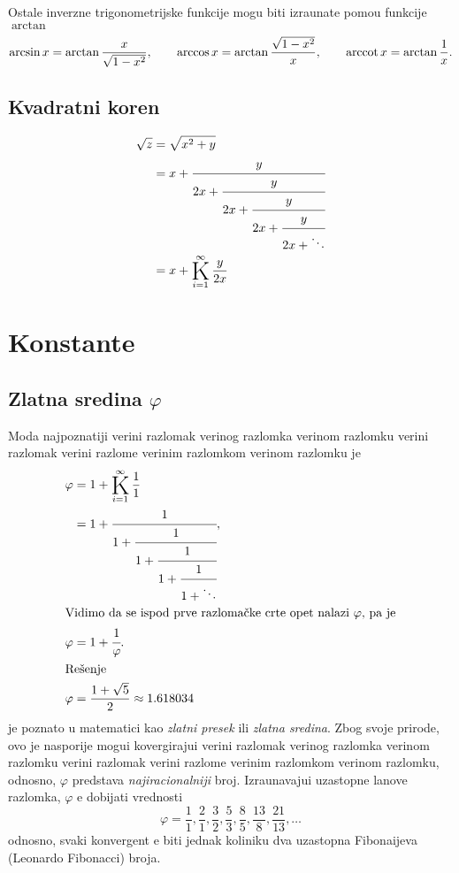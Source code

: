 \documentclass[12pt, twoside, a4paper]{article}
\def\vr#1{\ifcase#1\relax\or
  ve\-ri{\zv}\-ni raz\-lo\-mak\or
  ve\-ri{\zv}\-nog raz\-lom\-ka\or
  ve\-ri{\zv}\-nom raz\-lom\-ku\or
  ve\-ri{\zv}\-ni raz\-lo\-mak\or
  ve\-ri{\zv}\-ni raz\-lom\-{\cv}e\or
  ve\-ri{\zv}\-nim raz\-lom\-kom\or
  ve\-ri{\zv}\-nom raz\-lom\-ku\fi}
\begin{document}
\def\arccot{\mathop{\rm arccot}}
Ostale inverzne trigonometrijske funkcije mogu biti izra{\cv}unate pomo{\cc}u funkcije $\arctan$
$$
\arcsin x = \arctan{x\over \sqrt{1-x^2}},\qquad
\arccos x = \arctan{\sqrt{1-x^2}\over x},\qquad
\arccot x = \arctan{1\over x}.
$$

\iffalse

\subsection{Stepenova{\nj}e}

\def\rn#1{#1(2x^n+y)}
\def\rd#1{(m^2-#1^2n^2)y^2}
\begin{align*}
z^{m/n}&=(x^n+y)^{m/n}\\
&=x^m+
\cfrac{2x^m\cdot my}{\rn n-my+
\cfrac{\rd1}{\rn3+\cfrac{\rd2}{\rn5+\cfrac{\rd3}{\rn7+\ddots}}}}\\
&=x^m+{2x^m\cdot my \over \rn n-my+}\K_{i=1}^\infty{\rd i \over (2i+1)(2x^n+y)}
\end{align*}

\fi

\subsection{Kvadratni koren}

\begin{align*}
\sqrt z&=\sqrt{x^2+y}\\
&=x+
\cfrac{y}{2x+\cfrac{y}{2x+\cfrac{y}{2x+\cfrac{y}{2x+\ddots}}}}\\
&=x+\Kinf y{2x}
\end{align*}



\section{Konstante}

\subsection{Zlatna sredina $\varphi$}

Mo{\zv}da najpoznatiji \vr1 je
\begin{align*}
\varphi &=1+\Kinf11\\
&=1+\cfrac{1}{1+\cfrac{1}{1+\cfrac{1}{1+\cfrac{1}{1+\ddots}}}},\\
\intertext{Vidimo da se ispod prve razloma{\cv}ke crte opet nalazi $\varphi$, pa je}
\varphi&=1+\cfrac{1}{\varphi}.\\
\intertext{Re{\sv}e{\nj}e}
\varphi &= \frac{1+\sqrt5}{2} \approx 1.618034
\end{align*}
je poznato u matematici kao {\sl zlatni presek\/} ili {\sl zlatna sredina}.
Zbog svoje prirode, ovo je nasporije mogu{\cc}i kovergiraju{\cc}i \vr1,
odnosno, $\varphi$ predstav{\lj}a {\sl najiracionalniji\/} broj.
Izra\-{\cv}u\-na\-va\-ju{\cc}i uzastopne {\cv}lanove razlomka, $\varphi$ {\cc}e
dobijati vrednosti
$$
\varphi = \frac{1}{1},\frac{2}{1},\frac{3}{2},\frac{5}{3},\frac{8}{5},
\frac{13}{8},\frac{21}{13},\ldots
$$
odnosno, svaki konvergent {\cc}e biti jednak koli{\cv}niku dva uzastopna Fibona{\cv}ijeva (Leonardo Fibonacci) broja.
\end{document}
